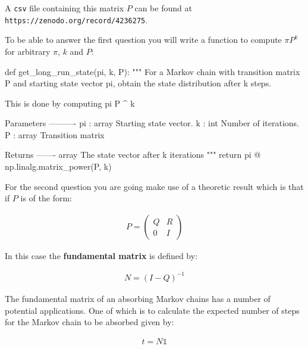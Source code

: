 A \texttt{csv} file containing this matrix \(P\) can be found at
\texttt{https://zenodo.org/record/4236275}.


To be able to answer the first question you will write a function to compute \(\pi
P ^ k\) for arbitrary \(\pi\), \(k\) and \(P\):




\begin{python}
def get_long_run_state(pi, k, P):
    """
    For a Markov chain with transition matrix P and starting state vector pi,
    obtain the state distribution after k steps.

    This is done by computing pi P ^ k

    Parameters
    ----------
    pi : array
        Starting state vector.
    k : int
        Number of iterations.
    P : array
        Transition matrix

    Returns
    -------
    array
        The state vector after k iterations
    """
    return pi @ np.linalg.matrix_power(P, k)
\end{python}





For the second question you are going make use of a theoretic result which is
that if \(P\) is of the form:

\begin{equation*}
\begin{split}
P = \begin{pmatrix}
        Q & R \\
        0 & I
    \end{pmatrix}
\end{split}
\end{equation*}

In this case the \textbf{fundamental matrix} is defined by:

\begin{equation*}
\begin{split}
    N = (I - Q) ^ {- 1}
\end{split}
\end{equation*}

The fundamental matrix of an absorbing Markov chains has a number of potential
applications. One of which is to calculate
the expected number of steps for the Markov chain to be absorbed given by:

\begin{equation*}
\begin{split}
    t = N\mathbb{1}
\end{split}
\end{equation*}

